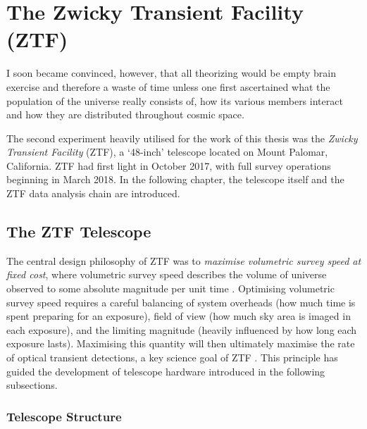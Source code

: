 \setchapterpreamble[u]{\margintoc}
\chapter{The Zwicky Transient Facility (ZTF)}
\begin{fquote}I soon became convinced, however, that all theorizing would be empty brain exercise and therefore a waste of time unless one first ascertained what the population of the universe really consists of, how its various members interact and how they are distributed throughout cosmic space.
\end{fquote}

The second experiment heavily utilised for the work of this thesis was the \emph{Zwicky Transient Facility} (ZTF), a `48-inch' telescope located on Mount Palomar, California. ZTF had first light in October 2017, with full survey operations beginning in March 2018. In the following chapter, the telescope itself and the ZTF data analysis chain are introduced.

\section{The ZTF Telescope}

The central design philosophy of ZTF was to \emph{maximise volumetric survey speed at fixed cost}, where volumetric survey speed describes the volume of universe observed to some absolute magnitude per unit time . Optimising volumetric survey speed requires a careful balancing of system overheads (how much time is spent preparing for an exposure), field of view (how much sky area is imaged in each exposure), and the limiting magnitude (heavily influenced by how long each exposure lasts). Maximising this quantity will then ultimately maximise the rate of optical transient detections, a key science goal of ZTF . This principle has guided the development of telescope hardware introduced in the following subsections.

\subsection*{Telescope Structure}


